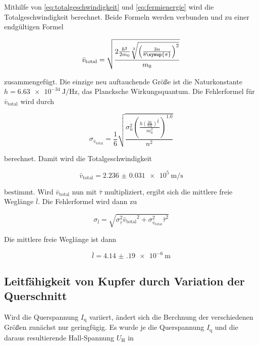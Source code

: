 Mithilfe von \autoref{eq:totalgeschwindigkeit} und \autoref{eq:fermienergie} wird die Totalgeschwindigkeit berechnet.
Beide Formeln werden verbunden und zu einer endgültigen Formel

\begin{equation}
    \bar{v}_\text{total} = \sqrt{\frac{2 \frac{\hbar^2}{2 m_0}\sqrt[3]{\left(\frac{3n}{8\symup{\pi}}\right)^2}}{m_0}}
    \label{eq:totalgeschw.}
\end{equation}

zusammengefügt.
Die einzige neu auftauchende Größe ist die Naturkonstante $h = \SI{6.63e-34}{\joule\per\hertz}$, das Plancksche Wirkungsquantum.\cite{physics_constants}
Die Fehlerformel für $\bar{v}_\text{total}$ wird durch 

\begin{equation}
    \sigma _{\bar{v}_\text{total}} = \frac{1}{6}  \sqrt{\frac{\sigma_{n}^{2} \left(\frac{h \left(\frac{3 n}{8 \Pi}\right)^{\frac{1}{6}}}{m_{0}^{2}}\right)^{1.0}}{n^{2}}}
    \label{eq:totalgeschw._fehler}
\end{equation}

berechnet.
Damit wird die Totalgeschwindigkeit

\begin{equation}
    \bar{v}_\text{total} = \SI{2.236(31)e5}{\meter\per\second}
    \label{eq:totalgeschw.1}
\end{equation}

bestimmt.
Wird $\bar{v}_\text{total}$ nun mit $\bar{\tau}$ multipliziert, ergibt sich die mittlere freie Weglänge $\bar{l}$.
Die Fehlerformel wird dann zu

\begin{equation}
    \sigma _{\bar{l}} = \sqrt{\sigma_{\bar{\tau}}^{2} {\bar{v}_\text{total}}^{2} + \sigma_{\bar{v}_\text{total}}^{2} {\bar{\tau}}^{2}}
    \label{eq:weglaenge_fehler}
\end{equation}

Die mittlere freie Weglänge ist dann

\begin{equation}
    \bar{l} = \SI{4.14(19)e-6}{\meter}
    \label{eq:weglaenge1}
\end{equation}

\subsection{Leitfähigkeit von Kupfer durch Variation der Querschnitt}
\label{ssec:c}

Wird die Querspannung $I_\text{q}$ variiert, ändert sich die Berchnung der verschiedenen Größen zunächst nur geringfügig.
Es wurde je die Querspannung $I_\text{q}$ und die daraus resultierende Hall-Spannung $U_\text{H}$ in 

